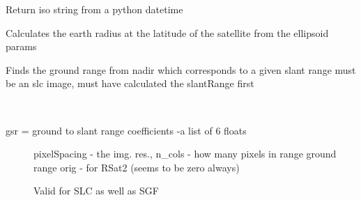 \documentclass[letterpaper,10pt,english]{sphinxmanual}
\begin{document}

\begin{fulllineitems}
\label{code:Metadata.datetime2iso}
Return iso string from a python datetime

\end{fulllineitems}


\begin{fulllineitems}
\label{code:Metadata.getEarthRadius}
Calculates the earth radius at the latitude of the satellite from the ellipsoid params

\end{fulllineitems}


\begin{fulllineitems}
\label{code:Metadata.getGroundRange}
Finds the ground range from nadir which corresponds to a given slant range
must be an slc image, must have calculated the slantRange first

\end{fulllineitems}


\begin{fulllineitems}
\label{code:Metadata.getSlantRange}~\begin{description}
\item[{gsr = ground to slant range coefficients -a list of 6 floats}] \leavevmode
pixelSpacing - the img. res., n\_cols - how many pixels in range
ground range orig - for RSat2 (seems to be zero always)

Valid for SLC as well as SGF

\end{description}

\end{fulllineitems}

\end{document}
